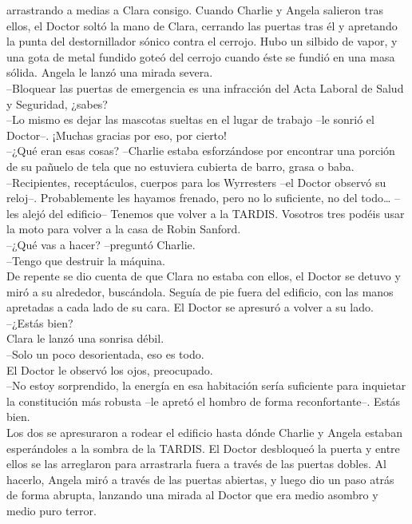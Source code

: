 arrastrando a medias a Clara consigo. Cuando Charlie y Angela salieron
tras ellos, el Doctor soltó la mano de Clara, cerrando las puertas tras
él y apretando la punta del destornillador sónico contra el cerrojo.
Hubo un silbido de vapor, y una gota de metal fundido goteó del cerrojo
cuando éste se fundió en una masa sólida. Angela le lanzó una mirada
severa.\\
--Bloquear las puertas de emergencia es una infracción del Acta Laboral
de Salud y Seguridad, ¿sabes?\\
--Lo mismo es dejar las mascotas sueltas en el lugar de trabajo --le
sonrió el Doctor--. ¡Muchas gracias por eso, por cierto!\\
--¿Qué eran esas cosas? --Charlie estaba esforzándose por encontrar una
porción de su pañuelo de tela que no estuviera cubierta de barro, grasa
o baba.\\
--Recipientes, receptáculos, cuerpos para los Wyrresters --el Doctor
observó su reloj--. Probablemente les hayamos frenado, pero no lo
suficiente, no del todo\ldots{} --les alejó del edificio-- Tenemos que
volver a la TARDIS. Vosotros tres podéis usar la moto para volver a la
casa de Robin Sanford.\\
--¿Qué vas a hacer? --preguntó Charlie.\\
--Tengo que destruir la máquina.\\
De repente se dio cuenta de que Clara no estaba con ellos, el Doctor se
detuvo y miró a su alrededor, buscándola. Seguía de pie fuera del
edificio, con las manos apretadas a cada lado de su cara. El Doctor se
apresuró a volver a su lado.\\
--¿Estás bien?\\
Clara le lanzó una sonrisa débil.\\
--Solo un poco desorientada, eso es todo.\\
El Doctor le observó los ojos, preocupado.\\
--No estoy sorprendido, la energía en esa habitación sería suficiente
para inquietar la constitución más robusta --le apretó el hombro de
forma reconfortante--. Estás bien.\\
Los dos se apresuraron a rodear el edificio hasta dónde Charlie y Angela
estaban esperándoles a la sombra de la TARDIS. El Doctor desbloqueó la
puerta y entre ellos se las arreglaron para arrastrarla fuera a través
de las puertas dobles. Al hacerlo, Angela miró a través de las puertas
abiertas, y luego dio un paso atrás de forma abrupta, lanzando una
mirada al Doctor que era medio asombro y medio puro terror.\\
